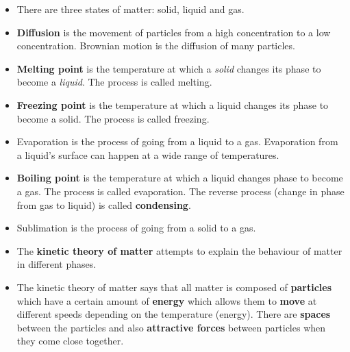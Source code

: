       
\label{m38730*cid7}
            \nopagebreak
\label{m38730*id311034}\begin{itemize}[noitemsep]
\label{m38730*id973}\item There are three states of matter: solid, liquid and gas.
\label{m38730*id872}\item \textbf{Diffusion} is the movement of particles from a high concentration to a low concentration. Brownian motion is the diffusion of many particles.
\label{m38730*uid83}\item \textbf{Melting point} is the temperature at which a \textsl{solid} changes its phase to become a \textsl{liquid}. The process is called melting.
\item \textbf{Freezing point} is the temperature at which a liquid changes its phase to become a solid. The process is called freezing.
\item Evaporation is the process of going from a liquid to a gas. Evaporation from a liquid’s surface can happen at a wide range of temperatures.
\label{m38730*uid84}\item \textbf{Boiling point} is the temperature at which a liquid changes phase to become a gas. The process is called evaporation. The reverse process (change in phase from gas to liquid) is called \textbf{condensing}.
\item Sublimation is the process of going from a solid to a gas. 
\item The \textbf{kinetic theory of matter} attempts to explain the behaviour of matter in different phases.
\label{m38730*uid81}\item The kinetic theory of matter says that all matter is composed of \textbf{particles} which have a certain amount of \textbf{energy} which allows them to \textbf{move} at different speeds depending on the temperature (energy). There are \textbf{spaces} between the particles and also \textbf{attractive forces} between particles when they come close together.
\end{itemize}
\label{m38730*cid9}
